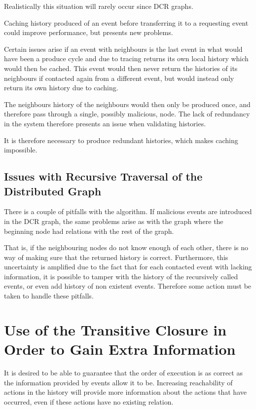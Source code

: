 	Realistically this situation will rarely occur since DCR graphs. 
	
	\newpar Caching history produced of an event before transferring it to a requesting event could improve performance, but presents new problems. 
	
	Certain issues arise if an event with neighbours is the last event in what would have been a produce cycle and due to tracing returns its own local history which would then be cached. This event would then never return the histories of its neighbours if contacted again from a different event, but would instead only return its own history due to caching. 
	
	The neighbours history of the neighbours would then only be produced once, and therefore pass through a single, possibly malicious, node. The lack of redundancy in the system therefore presents an issue when validating histories.
	
	It is therefore necessary to produce redundant histories, which makes caching impossible.
	
	\subsection{Issues with Recursive Traversal of the Distributed Graph}
	
	There is a couple of pitfalls with the algorithm. If malicious events are introduced in the DCR graph, the same problems arise as with the graph where the beginning node had relations with the rest of the graph. 
	
	\newpar That is, if the neighbouring nodes do not know enough of each other, there is no way of making sure that the returned history is correct. Furthermore, this uncertainty is amplified due to the fact that for each contacted event with lacking information, it is possible to tamper with the history of the recursively called events, or even add history of non existent events. Therefore some action must be taken to handle these pitfalls.
	
	\section{Use of the Transitive Closure in Order to Gain Extra Information}
	It is desired to be able to guarantee that the order of execution is as correct as the information provided by events allow it to be. Increasing reachability of actions in the history will provide more information about the actions that have occurred, even if these actions have no existing relation. 
	
